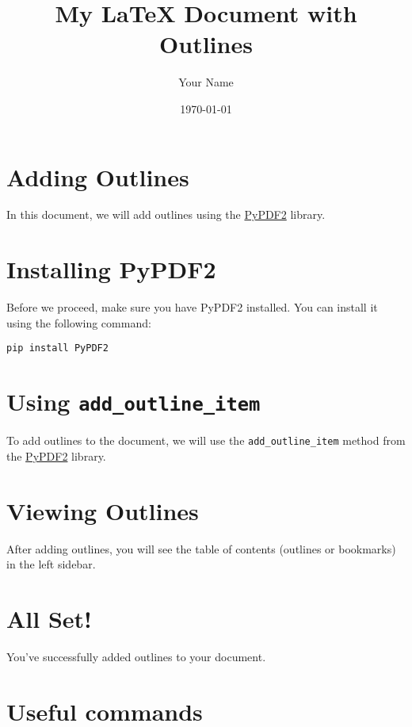 \documentclass{article}
\title{My LaTeX Document with Outlines}
\author{Your Name}
\date{\today}
\begin{document}
\maketitle

\tableofcontents

\newpage

\section{Adding Outlines}
In this document, we will add outlines using the \href{https://pypdf.readthedocs.io/en/stable/index.html}{PyPDF2} library.

\newpage

\section{Installing PyPDF2}
Before we proceed, make sure you have PyPDF2 installed. You can install it using the following command:

\texttt{pip install PyPDF2}

\newpage

\section{Using \texttt{add\_outline\_item}}
To add outlines to the document, we will use the \texttt{add\_outline\_item} method from the \href{https://pypdf.readthedocs.io/en/latest/modules/PdfMerger.html#pypdf.PdfMerger.add_outline_item}{PyPDF2} library.

\newpage

\section{Viewing Outlines}
After adding outlines, you will see the table of contents (outlines or bookmarks) in the left sidebar.

\newpage

\section{All Set!}
You've successfully added outlines to your document.

\newpage


\section{Useful commands}
\end{document}
